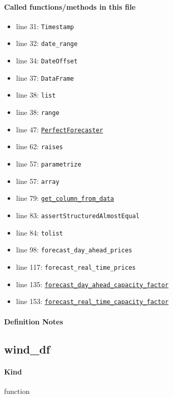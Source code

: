 \documentclass[11pt]{report}
\begin{document}
\paragraph{Called functions/methods in this file}
\begin{itemize}[leftmargin=*]
  \item line 31: \texttt{Timestamp}
  \item line 32: \texttt{date\_range}
  \item line 34: \texttt{DateOffset}
  \item line 37: \texttt{DataFrame}
  \item line 38: \texttt{list}
  \item line 38: \texttt{range}
  \item line 47: \hyperref[def:forecaster.py:PerfectForecaster:L686]{\texttt{PerfectForecaster}}
  \item line 62: \texttt{raises}
  \item line 57: \texttt{parametrize}
  \item line 57: \texttt{array}
  \item line 79: \hyperref[def:forecaster.py:PerfectForecaster.get_column_from_data:L762]{\texttt{get\_column\_from\_data}}
  \item line 83: \texttt{assertStructuredAlmostEqual}
  \item line 84: \texttt{tolist}
  \item line 98: \texttt{forecast\_day\_ahead\_prices}
  \item line 117: \texttt{forecast\_real\_time\_prices}
  \item line 135: \hyperref[def:forecaster.py:PerfectForecaster.forecast_day_ahead_capacity_factor:L790]{\texttt{forecast\_day\_ahead\_capacity\_factor}}
  \item line 153: \hyperref[def:forecaster.py:PerfectForecaster.forecast_real_time_capacity_factor:L793]{\texttt{forecast\_real\_time\_capacity\_factor}}
\end{itemize}
\paragraph{Definition Notes}
\subsection{wind\_df}
\label{def:tests-test_perfectforecaster.py:wind_df:L23}
\paragraph{Kind} function
\end{document}

